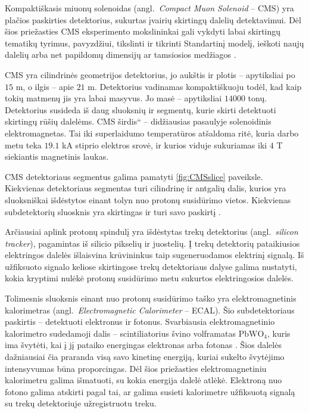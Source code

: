 \documentclass[a4paper, 12pt]{article}
\newcommand{\ltq}[1]{{\quotedblbase{}#1\textquotedblleft{}}}
\newlength\q
\begin{document}
Kompaktiškasis miuonų solenoidas (angl.\ \textit{Compact Muon Solenoid} -- CMS) yra plačios paskirties
detektorius, sukurtas įvairių skirtingų dalelių detektavimui.
Dėl šios priežasties CMS eksperimento mokslininkai gali vykdyti labai skirtingų tematikų tyrimus,
pavyzdžiui, tikslinti ir tikrinti Standartinį modelį, ieškoti naujų dalelių arba net papildomų
dimensijų ar tamsiosios medžiagos \cite{aboutCMS}.

CMS yra cilindrinės geometrijos detektorius, jo aukštis ir plotis -- apytiksliai po $15$ m, o ilgis --
apie $21$ m.
Detektorius vadinamas kompaktiškuoju todėl, kad kaip tokių matmenų jis yra labai masyvus.
Jo masė -- apytiksliai $14000$ tonų.
Detektorius susideda iš daug sluoksnių ir segmentų, kurie skirti detektuoti skirtingų rūšių dalelėms.
CMS \ltq{širdis} -- didžiausias pasaulyje solenoidinis elektromagnetas.
Tai iki superlaidumo temperatūros atšaldoma ritė, kuria darbo metu teka $19.1$ kA stiprio elektros srovė,
ir kurios viduje sukuriamas iki $4$ T siekiantis magnetinis laukas.

CMS detektoriaus segmentus galima pamatyti \ref{fig:CMSslice} paveiksle.
Kiekvienas detektoriaus segmentas turi cilindrinę ir antgalių dalis, kurios yra sluoksniškai išdėstytos
einant tolyn nuo protonų susidūrimo vietos.
Kiekvienas subdetektorių sluosknis yra skirtingas ir turi savo paskirtį \cite{CMSexperiment}.

Arčiausiai aplink protonų spindulį yra išdėstytas trekų detektorius (angl.\ \textit{silicon tracker}),
pagamintas iš silicio pikselių ir juostelių.
Į trekų detektorių pataikiusios elektringos dalelės išlaisvina krūvininkus taip sugeneruodamos elektrinį
signalą.
Iš užfiksuoto signalo keliose skirtingose trekų detektoriaus dalyse galima nustatyti, kokia kryptimi
nulėkė protonų susidūrimo metu sukurtos elektringosios dalelės.

Tolimesnis sluoksnis einant nuo protonų susidūrimo taško yra elektromagnetinis kalorimetras (angl.\
\textit{Electromagnetic Calorimeter} -- ECAL).
Šio subdetektoriaus paskirtis -- detektuoti elektronus ir fotonus.
Svarbiausia elektromagnetinio kalorimetro sudedamoji dalis -- scintiliatorius švino volframatas $\mathrm{PbWO}_{4}$,
kuris ima švytėti, kai į jį pataiko energingas elektronas arba fotonas \cite{ECALtrig}.
Šios dalelės dažniausiai čia praranda visą savo kinetinę energiją, kuriai sukelto švytėjimo intensyvumas
būna proporcingas.
Dėl šios priežasties elektromagnetiniu kalorimetru galima išmatuoti, su kokia energija dalelė atlėkė.
Elektroną nuo fotono galima atskirti pagal tai, ar galima susieti kalorimetre užfiksuotą signalą su trekų
detektoriuje užregistruotu treku.
\end{document}
